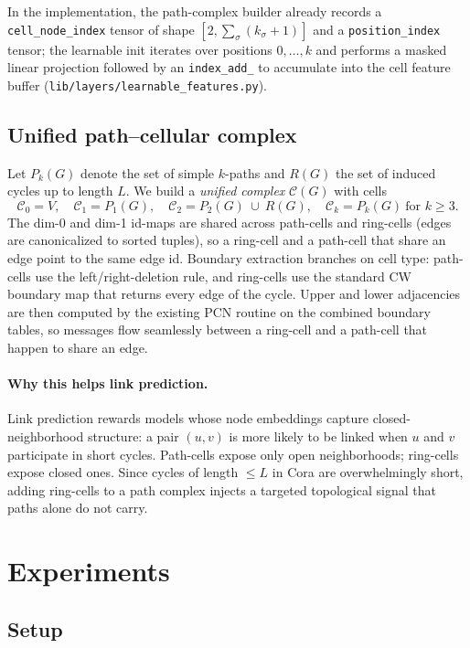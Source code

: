 \documentclass[11pt]{article}
\newcommand{\pcn}{\textsc{PCN}}
\begin{document}
In the implementation, the path-complex builder already records a
\texttt{cell\_node\_index} tensor of shape $[2,\sum_\sigma (k_\sigma+1)]$
and a \texttt{position\_index} tensor; the learnable init iterates over
positions $0,\ldots,k$ and performs a masked linear projection followed
by an \texttt{index\_add\_} to accumulate into the cell feature buffer
(\texttt{lib/layers/learnable\_features.py}).

\subsection{Unified path--cellular complex}

Let $P_k(G)$ denote the set of simple $k$-paths and $R(G)$ the set of
induced cycles up to length $L$. We build a \emph{unified complex}
$\mathcal{C}(G)$ with cells
\[
  \mathcal{C}_0 = V,\quad
  \mathcal{C}_1 = P_1(G),\quad
  \mathcal{C}_2 = P_2(G)\ \cup\ R(G),\quad
  \mathcal{C}_k = P_k(G)\ \text{for } k\ge3.
\]
The dim-0 and dim-1 id-maps are shared across path-cells and ring-cells
(edges are canonicalized to sorted tuples), so a ring-cell and a
path-cell that share an edge point to the same edge id. Boundary
extraction branches on cell type: path-cells use the left/right-deletion
rule, and ring-cells use the standard CW boundary map that returns every
edge of the cycle. Upper and lower adjacencies are then computed by the
existing \pcn{} routine on the combined boundary tables, so messages
flow seamlessly between a ring-cell and a path-cell that happen to share
an edge.

\paragraph{Why this helps link prediction.} Link prediction rewards
models whose node embeddings capture closed-neighborhood structure: a
pair $(u,v)$ is more likely to be linked when $u$ and $v$ participate in
short cycles. Path-cells expose only open neighborhoods; ring-cells
expose closed ones. Since cycles of length $\le L$ in Cora are
overwhelmingly short, adding ring-cells to a path complex injects a
targeted topological signal that paths alone do not carry.

\section{Experiments}

\subsection{Setup}
\end{document}
